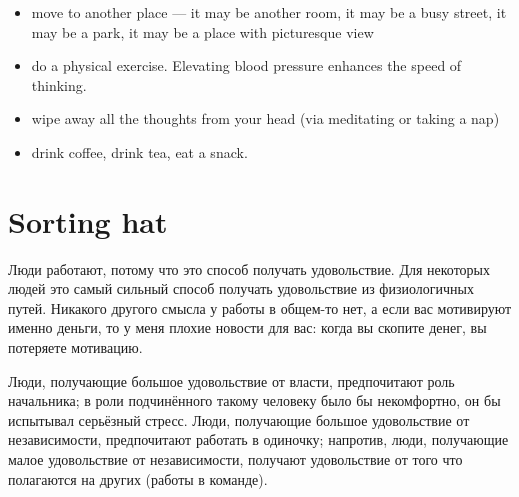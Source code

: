 \documentclass[11pt]{article}
\theoremstyle{remark}
\theoremstyle{definition}
\begin{document}
\begin{itemize}
\begin{itemize}
\item move to another place --- it may be another room, it may be a busy street, it may be a park, it may be a place with picturesque view

\item do a physical exercise. Elevating blood pressure enhances the speed of thinking.

\item wipe away all the thoughts from your head (via meditating or taking a nap) 

\item drink coffee, drink tea, eat a snack.

\end{itemize}




\end{itemize}


\section{Sorting hat}


Люди работают, потому что это способ получать удовольствие. Для некоторых людей это самый сильный способ получать удовольствие из физиологичных путей. Никакого другого смысла у работы в общем-то нет, а если вас мотивируют именно деньги, то у меня плохие новости для вас: когда вы скопите денег, вы потеряете мотивацию.





Люди, получающие большое удовольствие от власти, предпочитают роль начальника; в роли подчинённого такому человеку было бы некомфортно, он бы испытывал серьёзный стресс. Люди, получающие большое удовольствие от независимости, предпочитают работать в одиночку; напротив, люди, получающие малое удовольствие от независимости, получают удовольствие от того что полагаются на других (работы в команде). 




\end{document}

